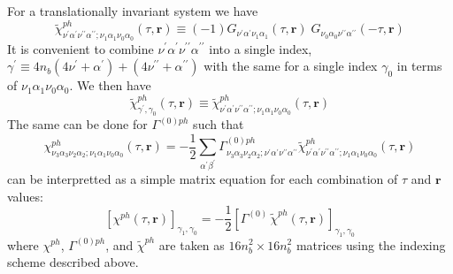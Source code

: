 For a translationally invariant system we have
\begin{equation}
\tilde{\chi}^{ph}_{\nu^{\prime}\alpha^{\prime}\nu^{\prime\prime}\alpha^{\prime\prime}; 
\nu_1\alpha_1 \nu_0\alpha_0}(\tau,\mathbf{r}) \equiv
(-1) G_{\nu^{\prime}\alpha^{\prime}\nu_1 \alpha_1}(\tau,\mathbf{r}) \; 
G_{\nu_0\alpha_0 \nu^{\prime\prime}\alpha^{\prime\prime}}(-\tau,\mathbf{r})
\end{equation}
It is convenient to combine $\nu^{\prime}\alpha^{\prime}\nu^{\prime\prime}
\alpha^{\prime\prime}$
into a single index, $\gamma^{\prime} \equiv
4 n_b(4\nu^{\prime}+ \alpha^{\prime}) + (4\nu^{\prime\prime} + 
\alpha^{\prime\prime})$ with the same
for a single index $\gamma_0$ in
terms of $\nu_1\alpha_1\nu_0\alpha_0$.  We then have
\begin{equation}
\tilde{\chi}^{ph}_{\gamma^{\prime},\gamma_0}(\tau,\mathbf{r}) \equiv
\tilde{\chi}^{ph}_{\nu^{\prime}\alpha^{\prime}\nu^{\prime\prime}\alpha^{\prime\prime}; 
\nu_1\alpha_1 \nu_0\alpha_0}(\tau,\mathbf{r})
\end{equation}
The same can be done for $\Gamma^{(0)ph}$ such that
\begin{equation}
\chi^{ph}_{\nu_3\alpha_3\nu_2\alpha_2;\nu_1\alpha_1\nu_0\alpha_0}(\tau,\mathbf{r}) 
=-\frac{1}{2} \sum_{\alpha^{\prime}\beta^{\prime}} 
\Gamma^{(0)ph}_{\nu_3\alpha_3\nu_2\alpha_2;\nu^{\prime}\alpha^{\prime}
\nu^{\prime\prime}\alpha^{\prime\prime}}
\tilde{\chi}^{ph}_{\nu^{\prime}\alpha^{\prime}\nu^{\prime\prime}\alpha^{\prime\prime};
\nu_1\alpha_1\nu_0\alpha_0}
(\tau,\mathbf{r})
\end{equation}
can be interpretted as a simple matrix equation for each combination
of $\tau$ and $\mathbf{r}$ values:
\begin{equation}
\left[\chi^{ph}(\tau,\mathbf{r})\right]_{\gamma_1,\gamma_0} =
-\frac{1}{2}
\left[\Gamma^{(0)}\,\tilde{\chi}^{ph}(\tau,\mathbf{r})\right]_{\gamma_1,\gamma_0}
\end{equation}
where $\chi^{ph}$, $\Gamma^{(0)ph}$, and $\tilde{\chi}^{ph}$
are taken as $16n_b^2 \times 16n_b^2$ matrices using the indexing scheme
described above.

